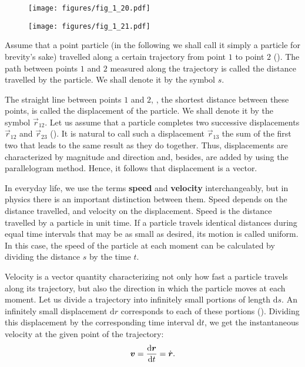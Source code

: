\begin{figure}[t]
	\begin{minipage}[t]{0.5\linewidth}
		\begin{center}
			\texttt{[image: figures/fig\_1\_20.pdf]}
			\caption[]{}
			\label{fig:1_20}
		\end{center}
	\end{minipage}
	\hfill{ }%
	\begin{minipage}[t]{0.5\linewidth}
		\begin{center}
			\texttt{[image: figures/fig\_1\_21.pdf]}
			\caption[]{}
			\label{fig:1_21}
		\end{center}
	\end{minipage}
\end{figure}

Assume that a point particle (in the following we shall call it simply a particle for brevity's sake) travelled along a certain trajectory from point $1$ to point $2$ (). The path between points $1$ and $2$ measured along the trajectory is called the distance travelled by the particle. We shall denote it by the symbol $s$.

The straight line between points $1$ and $2$, \ie, the shortest distance between these points, is called the displacement of the particle. We shall denote it by the symbol $\vec{r}_{12}$. Let us assume that a particle completes two successive displacements $\vec{r}_{12}$ and $\vec{r}_{23}$ (). It is natural to call such a displacement $\vec{r}_{13}$ the sum of the first two that leads to the same result as they do together. Thus, displacements are characterized by magnitude and direction and, besides, are added by using the parallelogram method. Hence, it follows that displacement is a vector.

In everyday life, we use the terms \textbf{speed} and \textbf{velocity} interchangeably, but in physics there is an important distinction between them. Speed depends on the distance travelled, and velocity on the displacement. Speed is the distance travelled by a particle in unit time. If a particle travels identical distances during equal time intervals that may be as small as desired, its motion is called uniform. In this case, the speed of the particle at each moment can be calculated by dividing the distance $s$ by the time $t$.

Velocity is a vector quantity characterizing not only how fast a particle travels along its trajectory, but also the direction in which the particle moves at each moment. Let us divide a trajectory into infinitely small portions of length $\mathrm{d}s$. An infinitely small displacement $\mathrm{d}r$ corresponds to each of these portions (). Dividing this displacement by the corresponding time interval $\mathrm{d}t$, we get the instantaneous velocity at the given point of the trajectory:
\begin{equation}\label{eq:1_57}
\boldsymbol{v} = \frac{\mathrm{d}\boldsymbol{r}}{\mathrm{d} t} = \dot{\boldsymbol{r}}.
\end{equation}

